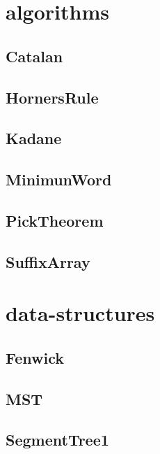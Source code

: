 \section{algorithms}
\subsection{ Catalan}
\raggedbottom
\hrulefill
\subsection{ HornersRule}
\raggedbottom
\hrulefill
\subsection{ Kadane}
\raggedbottom
\hrulefill
\subsection{ MinimunWord}
\raggedbottom
\hrulefill
\subsection{ PickTheorem}
\raggedbottom
\hrulefill
\subsection{ SuffixArray}
\raggedbottom
\hrulefill

\section{data-structures}
\subsection{ Fenwick}
\raggedbottom
\hrulefill
\subsection{ MST}
\raggedbottom
\hrulefill
\subsection{ SegmentTree1}
\raggedbottom
\hrulefill
